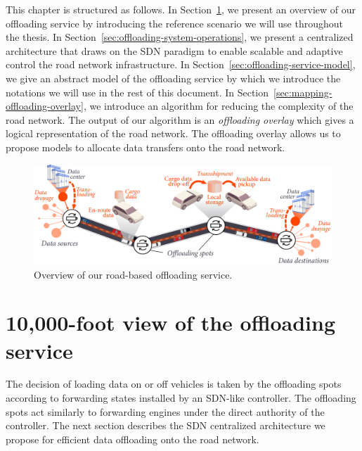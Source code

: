 This chapter is structured as follows. In Section~\ref{sec:overview-service}, we present an overview of our offloading service by introducing the reference scenario we will use throughout the thesis. In Section~\ref{sec:offloading-system-operations}, we present a centralized architecture that draws on the SDN paradigm to enable scalable and adaptive control the road network infrastructure. In Section~\ref{sec:offloading-service-model}, we give an abstract model of the offloading service by which we introduce the notations we will use in the rest of this document. In Section~\ref{sec:mapping-offloading-overlay}, we introduce an algorithm for reducing the complexity of the road network. The output of our algorithm is an \textit{offloading overlay} which gives a logical representation of the road network. The offloading overlay allows us to propose models to allocate data transfers onto the road network.

\begin{figure}[h!]
	\centering
		\includegraphics[width=0.75\columnwidth]{figures/taxonomy.pdf}
	\caption{Overview of our road-based offloading service.}
	\label{fig:taxonomy}
\end{figure}

\section{10,000-foot view of the offloading service}
\label{sec:overview-service}



The decision of loading data on or off vehicles is taken by the offloading spots according to forwarding states installed by an SDN-like controller. The offloading spots act similarly to forwarding engines under the direct authority of the controller. The next section describes the SDN centralized architecture we propose for efficient data offloading onto the road network.   

